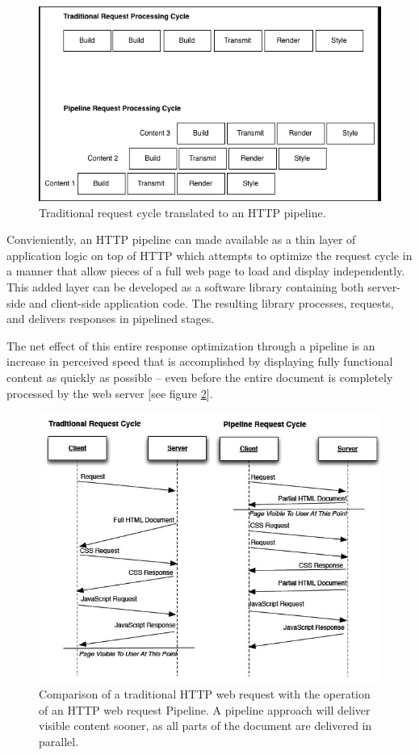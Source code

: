 \documentclass[12pt]{report}
\begin{document}
\begin{figure}[H]
\label{fig:traditonalVsPipelineReqestCycle}
\centering
\includegraphics[width=\textwidth,keepaspectratio]{figures/images/pipeline_request_cycle_linear.png}
\caption{Traditional request cycle translated to an HTTP pipeline.}
\end{figure}

Convieniently, an HTTP pipeline can made available as a thin layer of application logic on top of HTTP which attempts to optimize the request cycle in a manner that allow pieces of a full web page to load and display independently.  This added layer can be developed as a software library containing both server-side and client-side application code. The resulting library processes, requests, and delivers responses in pipelined stages.  

The net effect of this entire response  optimization through a pipeline is an increase in perceived speed that is accomplished by displaying fully functional content as quickly as possible – even before the entire document is completely processed by the web server [see figure \ref{fig:HTTPRequestCycles}]. 

\begin{figure}[H]
\label{fig:HTTPRequestCycles}
\centering
\includegraphics[width=145mm]{figures/images/HTTP_request_cycles.jpg}
\caption{Comparison of a traditional HTTP web request with the operation of an HTTP web request Pipeline. A pipeline approach will deliver visible content sooner, as all parts of the  document are delivered in parallel.}
\end{figure}
\end{document}
